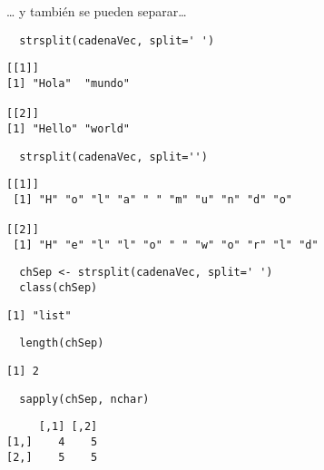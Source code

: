 \documentclass[xcolor={usenames,svgnames,dvipsnames}]{beamer}
\begin{document}
\begin{frame}[fragile,label={sec:org90184d1}]{\ldots{} y también se pueden separar\ldots{}}
 \lstset{language=r,label= ,caption= ,captionpos=b,numbers=none}
\begin{lstlisting}
  strsplit(cadenaVec, split=' ')
\end{lstlisting}

\begin{verbatim}
[[1]]
[1] "Hola"  "mundo"

[[2]]
[1] "Hello" "world"
\end{verbatim}

\lstset{language=r,label= ,caption= ,captionpos=b,numbers=none}
\begin{lstlisting}
  strsplit(cadenaVec, split='')
\end{lstlisting}

\begin{verbatim}
[[1]]
 [1] "H" "o" "l" "a" " " "m" "u" "n" "d" "o"

[[2]]
 [1] "H" "e" "l" "l" "o" " " "w" "o" "r" "l" "d"
\end{verbatim}

\lstset{language=r,label= ,caption= ,captionpos=b,numbers=none}
\begin{lstlisting}
  chSep <- strsplit(cadenaVec, split=' ')
  class(chSep)
\end{lstlisting}

\begin{verbatim}
[1] "list"
\end{verbatim}

\lstset{language=r,label= ,caption= ,captionpos=b,numbers=none}
\begin{lstlisting}
  length(chSep)
\end{lstlisting}

\begin{verbatim}
[1] 2
\end{verbatim}

\lstset{language=r,label= ,caption= ,captionpos=b,numbers=none}
\begin{lstlisting}
  sapply(chSep, nchar)
\end{lstlisting}

\begin{verbatim}
     [,1] [,2]
[1,]    4    5
[2,]    5    5
\end{verbatim}
\end{frame}
\end{document}
